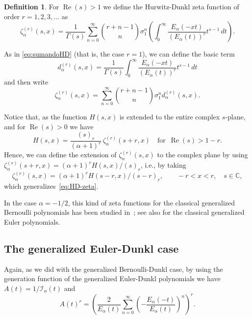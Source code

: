 \documentclass[a4paper]{amsart}
\newcommand{\C}{\mathbb{C}}
\newcommand{\I}{\mathcal{I}}
\newcommand{\Ea}{E_{\alpha}}
\renewcommand{\Re}{\operatorname{Re}}
\theoremstyle{plain}
\theoremstyle{definition}
\newtheorem{definition}[theorem]{Definition}
\theoremstyle{remark}
\numberwithin{equation}{section}
\begin{document}
\begin{definition}
\label{def:zetaBDr}
For $\Re(s) > 1$ we define the Hurwitz-Dunkl zeta function of order $r=1,2,3,\dots$ as
\[
\zeta_{\alpha}^{(r)}(s,x) 
 = \frac{1}{\Gamma(s)} \sum_{n=0}^{\infty} \binom{r+n-1}{n} \sigma_1^n 
 \left(\int_{0}^{\infty} \frac{\Ea(-xt)}{\left(\Ea(t)\right)^r} t^{s-1} \,dt \right).
\]

As in \eqref{eq:sumandoHD} (that is, the case $r=1$), we can define the basic term
\begin{equation*}
d_{\alpha}^{(r)}(s,x) = \frac{1}{\Gamma(s)} \int_{0}^{\infty} 
\frac{\Ea(-xt)}{(\Ea(t))^r} t^{s-1} \,dt
\end{equation*}
and then write
\[
\zeta_{\alpha}^{(r)}(s,x) 
= \sum_{n=0}^{\infty} \binom{r+n-1}{n} \sigma_1^n d_{\alpha}^{(r)}(s,x).
\]
\end{definition}

Notice that, as the function $H(s,x)$ is extended to the entire complex $s$-plane, and for $\Re(s)>0$ we have
\begin{equation*}
H(s,x) = \frac{(s)_r}{(\alpha+1)^r} \,\zeta_{\alpha}^{(r)}(s+r,x)
\quad\text{for }\, \Re(s)>1-r.
\end{equation*}
Hence, we can define the extension of $\zeta_{\alpha}^{(r)}(s,x)$ to the complex plane by using $\zeta_{\alpha}^{(r)}(s+r,x) = (\alpha+1)^r H(s,x)/(s)_r$,
i.e., by taking
\[
  \zeta_{\alpha}^{(r)}(s,x) = (\alpha+1)^r H(s-r,x)/(s-r)_r,
  \qquad -r<x<r,\quad s \in \C,
\]
which generalizes~\eqref{eq:HD-zeta}.

In the case $\alpha=-1/2$, this kind of zeta functions for the classical generalized Bernoulli polynomials has been studied in~\cite[\S\,4.4]{BayChi}; see also \cite[\S\,4.1]{BayChi} for the classical generalized Euler polynomials. 


\subsection{The generalized Euler-Dunkl case}

Again, as we did with the generalized Bernoulli-Dunkl case, by using the generation function of the generalized Euler-Dunkl polynomials we have $A(t) = 1/\I_{\alpha}(t)$ and
\[
A(t)^r = \left( \frac{2}{\Ea(t)}
\sum_{n=0}^{\infty} \left(-\frac{\Ea(-t)}{\Ea(t)}\right)^n\right)^r.
\]
\end{document}
